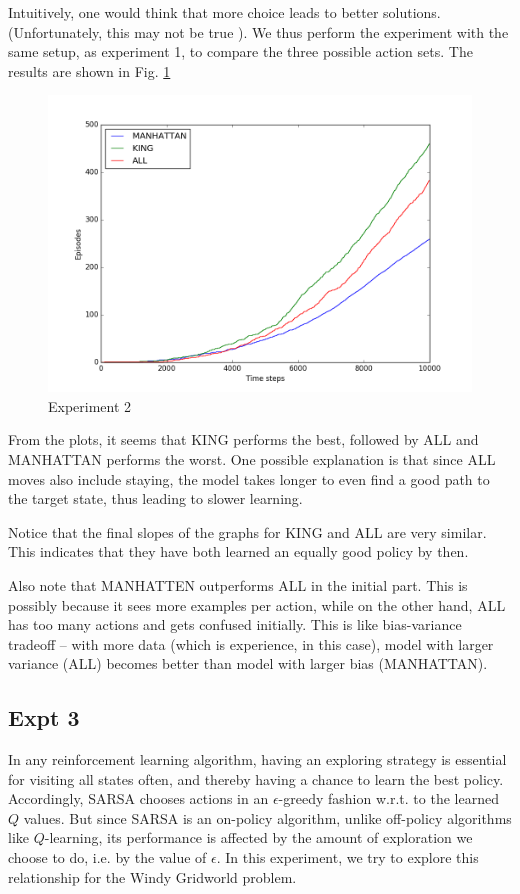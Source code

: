\documentclass{article}
\begin{document}
    Intuitively, one would think that more choice leads to better solutions. (Unfortunately, this may not be true \cite{choice}). We thus perform the experiment with the same setup, as experiment 1, to compare the three possible action sets.
    The results are shown in Fig. \ref{fig:expt2}

    \begin{figure}[!h]
        \centering
        \includegraphics[width=\textwidth]{expt2}
        \caption{Experiment 2}
        \label{fig:expt2}
    \end{figure}

    From the plots, it seems that KING performs the best, followed by ALL and MANHATTAN performs the worst. One possible explanation is that since ALL moves also include staying, the model takes longer to even find a good path to the target state, thus leading to slower learning.
    
    Notice that the final slopes of the graphs for KING and ALL are very similar. This indicates that they have both learned an equally good policy by then.
    
    Also note that MANHATTEN outperforms ALL in the initial part. This is possibly because it sees more examples per action, while on the other hand, ALL has too many actions and gets confused initially. This is like bias-variance tradeoff -- with more data (which is experience, in this case), model with larger variance (ALL) becomes better than model with larger bias (MANHATTAN).


\subsection{Expt 3}
    In any reinforcement learning algorithm, having an exploring strategy is essential for visiting all states often, and thereby having a chance to learn the best policy. Accordingly, SARSA chooses actions in an $\epsilon$-greedy fashion w.r.t. to the learned $Q$ values. But since SARSA is an on-policy algorithm, unlike off-policy algorithms like $Q$-learning, its performance is affected by the amount of exploration we choose to do, i.e. by the value of $\epsilon$. In this experiment, we try to explore this relationship for the Windy Gridworld problem.
    
\end{document}
